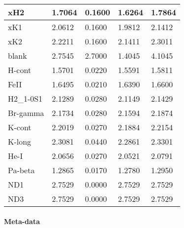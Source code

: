 \begin{longtable*}[c]{|p{0.110\DUtablewidth}|p{0.086\DUtablewidth}|p{0.086\DUtablewidth}|p{0.145\DUtablewidth}|p{0.133\DUtablewidth}|}
xH2
 & 
1.7064
 & 
0.1600
 & 
1.6264
 & 
1.7864
 \\
\hline

xK1
 & 
2.0612
 & 
0.1600
 & 
1.9812
 & 
2.1412
 \\
\hline

xK2
 & 
2.2211
 & 
0.1600
 & 
2.1411
 & 
2.3011
 \\
\hline

blank
 & 
2.7545
 & 
2.7000
 & 
1.4045
 & 
4.1045
 \\
\hline

H-cont
 & 
1.5701
 & 
0.0220
 & 
1.5591
 & 
1.5811
 \\
\hline

FeII
 & 
1.6495
 & 
0.0210
 & 
1.6390
 & 
1.6600
 \\
\hline

H2\_1-0S1
 & 
2.1289
 & 
0.0280
 & 
2.1149
 & 
2.1429
 \\
\hline

Br-gamma
 & 
2.1734
 & 
0.0280
 & 
2.1594
 & 
2.1874
 \\
\hline

K-cont
 & 
2.2019
 & 
0.0270
 & 
2.1884
 & 
2.2154
 \\
\hline

K-long
 & 
2.3081
 & 
0.0440
 & 
2.2861
 & 
2.3301
 \\
\hline

He-I
 & 
2.0656
 & 
0.0270
 & 
2.0521
 & 
2.0791
 \\
\hline

Pa-beta
 & 
1.2865
 & 
0.0170
 & 
1.2780
 & 
1.2950
 \\
\hline

ND1
 & 
2.7529
 & 
0.0000
 & 
2.7529
 & 
2.7529
 \\
\hline

ND3
 & 
2.7529
 & 
0.0000
 & 
2.7529
 & 
2.7529
 \\
\hline
\end{longtable*}
\label{tbl-filter-wheel}


\paragraph{Meta-data%
  \label{id2}%
}

